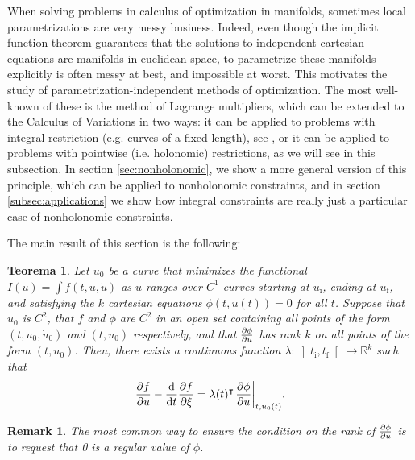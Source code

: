 \documentclass{article}
\theoremstyle{plain}
\newtheorem{theorem}{Teorema}
\theoremstyle{plain}
\newtheorem{remark}{Remark}
\theoremstyle{nonumberplain}
\theoremstyle{empty}
\newcommand{\R}{\mathbb{R}}
\newcommand{\tr}{\intercal}
\newcommand{\tstart}{\mathrm{i}}
\newcommand{\tend}{\mathrm{f}}
\DeclarePairedDelimiter\eval{.}{\rvert}
\begin{document}
When solving problems in calculus of optimization in manifolds, sometimes local parametrizations are very messy business. Indeed, even though the implicit function theorem guarantees that the solutions to independent cartesian equations are manifolds in euclidean space, to parametrize these manifolds explicitly is often messy at best, and impossible at worst. This motivates the study of parametrization-independent methods of optimization. The most well-known of these is the method of Lagrange multipliers, which can be extended to the Calculus of Variations in two ways: it can be applied to problems with integral restriction (e.g. curves of a fixed length), see \cite[\S 12.1]{gelfandfomin}, or it can be applied to problems with pointwise (i.e. holonomic) restrictions, as we will see in this subsection. In section \ref{sec:nonholonomic}, we show a more general version of this principle, which can be applied to nonholonomic constraints, and in section \ref{subsec:applications} we show how integral constraints are really just a particular case of nonholonomic constraints. %

The main result of this section is the following:

\begin{theorem}\label{lagrangeholonomic}
Let $u_0$ be a curve that minimizes the functional $I(u) = \int f(t,u,\dot u)$ as $u$ ranges over $C^1$ curves starting at $u_\tstart$, ending at $u_\tend$, and satisfying the $k$ cartesian equations $\phi(t,u(t)) = 0$ for all $t$. Suppose that $u_0$ is $C^2$, that $f$ and $\phi$ are $C^2$ in an open set containing all points of the form $(t,u_0,\dot u_0)$ and $(t,u_0)$ respectively, and that $\diffp \phi u$ has rank $k$ on all points of the form $(t,u_0)$. Then, there exists a continuous function $\lambda \colon \left]t_\tstart, t_\tend\right[ \to \R^k$ such that
\begin{equation}\label{eq:lagrangeholonomic}
\diffp f u - \diff*{\diffp f \xi}t = \lambda(t)^\tr \eval*{\diffp{\phi}{u}}_{t,u_0(t)}.
\end{equation}
\end{theorem}

\begin{remark}
The most common way to ensure the condition on the rank of $\diffp \phi u$ is to request that 0 is a regular value of $\phi$.
\end{remark}
\end{document}
